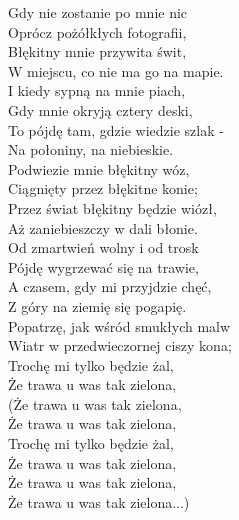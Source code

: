 \begin{flushleft}
Gdy nie zostanie po mnie nic   \tab{}\\
Oprócz pożółkłych fotografii,  \tab{} \\
Błękitny mnie przywita świt,  \tab{}  \\
W miejscu, co nie ma go na mapie.   \\
\vskip 3mm
I kiedy sypną na mnie piach, \\
Gdy mnie okryją cztery deski, \\
To pójdę tam, gdzie wiedzie szlak - \\
Na połoniny, na niebieskie. \\
\vskip 3mm
Podwiezie mnie błękitny wóz, \\
Ciągnięty przez błękitne konie; \\
Przez świat błękitny będzie wiózł, \\
Aż zaniebieszczy w dali błonie. \\
\vskip 3mm
Od zmartwień wolny i od trosk \\
Pójdę wygrzewać się na trawie, \\
A czasem, gdy mi przyjdzie chęć, \\
Z góry na ziemię się pogapię. \\
\vskip 3mm
Popatrzę, jak wśród smukłych malw \\
Wiatr w przedwieczornej ciszy kona; \\
Trochę mi tylko będzie żal, \\
Że trawa u was tak zielona, \\
(Że trawa u was tak zielona, \\
Że trawa u was tak zielona, \\
Trochę mi tylko będzie żal, \\
Że trawa u was tak zielona, \\
Że trawa u was tak zielona, \\
Że trawa u was tak zielona...) \\
\end{flushleft}
\clearpage
